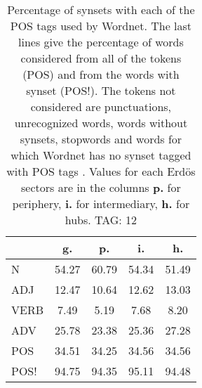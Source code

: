 \begin{table}[h!]
\begin{center}
\begin{tabular}{| l | c | c | c | c |}\hline
 & g. & p. & i. & h. \\\hline
N & 54.27  & 60.79  & 54.34  & 51.49 \\\hline
ADJ & 12.47  & 10.64  & 12.62  & 13.03 \\\hline
VERB & 7.49  & 5.19  & 7.68  & 8.20 \\\hline
ADV & 25.78  & 23.38  & 25.36  & 27.28 \\\hline
POS & 34.51  & 34.25  & 34.56  & 34.56 \\\hline
POS! & 94.75  & 94.35  & 95.11  & 94.48 \\\hline
\end{tabular}
\caption{Percentage of synsets with each of the POS tags used by Wordnet. The last lines give the percentage of words considered from all of the tokens (POS) and from the words with synset (POS!). The tokens not considered are punctuations, unrecognized words, words without synsets, stopwords and words for which Wordnet has no synset  tagged with POS tags . Values for each Erd\"os sectors are in the columns {{\bf p.}} for periphery, {{\bf i.}} for intermediary, {{\bf h.}} for hubs. TAG: 12}
\end{center}
\end{table}